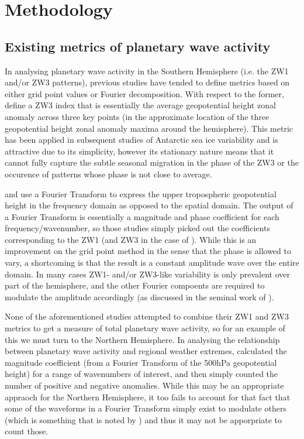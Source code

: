 \section{Methodology}\label{s:methodology}

\subsection{Existing metrics of planetary wave activity}\label{s:existing_metrics}

In analysing planetary wave activity in the Southern Hemisphere (i.e. the ZW1 and/or ZW3 patterns), previous studies have tended to define metrics based on either grid point values or Fourier decomposition. With respect to the former, \citet{Raphael2004} define a ZW3 index that is essentially the average geopotential height zonal anomaly across three key points (in the approximate location of the three geopotential height zonal anomaly maxima around the hemisphere). This metric has been applied in subsequent studies of Antarctic sea ice variability \citep{Raphael2007,Raphael2014} and is attractive due to its simplicity, however its stationary nature means that it cannot fully capture the subtle \citep[but not insignificant at around 15 degrees of longitude on average;][]{Raphael2004} seasonal migration in the phase of the ZW3 or the occurence of patterns whose phase is not close to average.

\citet{Hobbs2007} and \citet{Hobbs2010} use a Fourier Transform to express the upper tropospheric geopotential height in the frequency domain as opposed to the spatial domain. The output of a Fourier Transform is essentially a magnitude and phase coefficient for each frequency/wavenumber, so those studies simply picked out the coefficients corresponding to the ZW1 (and ZW3 in the case of \citet{Hobbs2010}). While this is an improvement on the grid point method in the sense that the phase is allowed to vary, a shortcoming is that the result is a constant amplitude wave over the entire domain. In many cases ZW1- and/or ZW3-like variability is only prevalent over part of the hemisphere, and the other Fourier compoents are required to modulate the amplitude accordingly (as discussed in the seminal work of \citet{vanLoon1972}).

None of the aforementioned studies attempted to combine their ZW1 and ZW3 metrics to get a measure of total planetary wave activity, so for an example of this we must turn to the Northern Hemisphere. In analysing the relationship between planetary wave activity and regional weather extremes, \citet{Screen2014} calculated the magnitude coefficient (from a Fourier Transform of the 500hPa geopotential height) for a range of wavenumbers of interest, and then simply counted the number of positive and negative anomalies. While this may be an appropriate appraoch for the Northern Hemisphere, it too fails to account for that fact that some of the waveforms in a Fourier Transform simply exist to modulate others (which is something that is noted by \citet{Screen2014}) and thus it may not be apporpriate to count those.  
